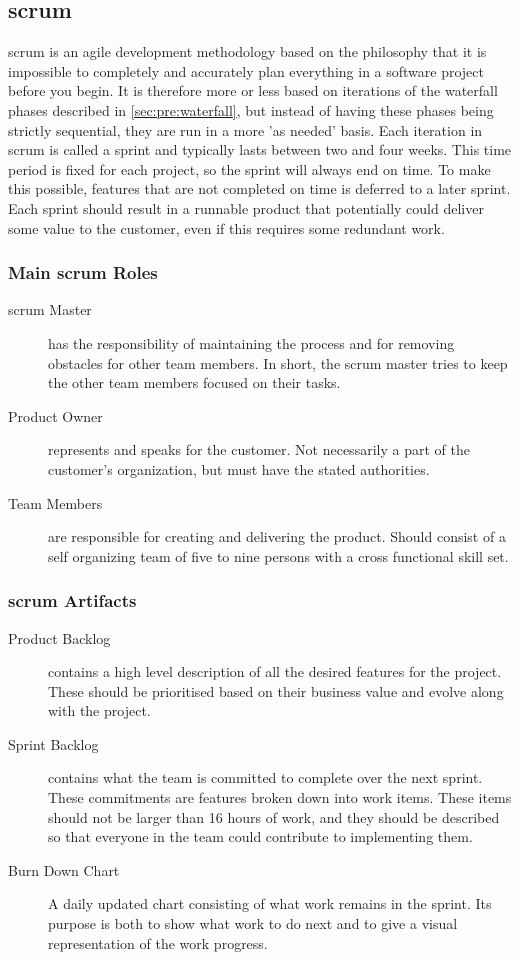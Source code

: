 \subsection{\Gls{scrum}}
\label{sec:pre:scrum}
\Gls{scrum} is an agile development methodology based on the philosophy that it is
impossible to completely and accurately plan everything in a software project
before you begin. It is therefore more or less based on iterations of the
waterfall phases described in \autoref{sec:pre:waterfall}, but instead of
having these phases being strictly sequential, they are run in a more
'as needed' basis. Each iteration in \Gls{scrum} is called a sprint and typically
lasts between two and four weeks. This time period is fixed for each
project, so the sprint will always end on time. To make this possible, features
that are not completed on time is deferred to a later sprint. Each sprint
should result in a runnable product that potentially could deliver some value
to the customer, even if this requires some redundant work.

\subsubsection{Main \Gls{scrum} Roles}
\begin{description}
	\item[\Gls{scrum} Master] has the responsibility of maintaining the process and
		for removing obstacles for other team members. In short, the \Gls{scrum}
		master tries to keep the other team members focused on their tasks.
	\item[Product Owner] represents and speaks for the customer. Not
		necessarily a part of the customer's organization, but must have the
		stated authorities.
	\item[Team Members] are responsible for creating and delivering the product.
		Should consist of a self organizing team of five to nine persons with
		a cross functional skill set.
\end{description}

\subsubsection{\Gls{scrum} Artifacts}
\begin{description}
	\item[Product Backlog] contains a high level description of all the desired
		features for the project. These should be prioritised based on their
		business value and evolve along with the project.
	\item[Sprint Backlog] contains what the team is committed to complete over
		the next sprint. These commitments are features broken down into work
		items. These items should not be larger than 16 hours of work, and they
		should be described so that everyone in the team could contribute to
		implementing them.
	\item[Burn Down Chart] A daily updated chart consisting of what work
		remains in the sprint. Its purpose is both to show what work to do next
		and to give a visual representation of the work progress.
\end{description}

